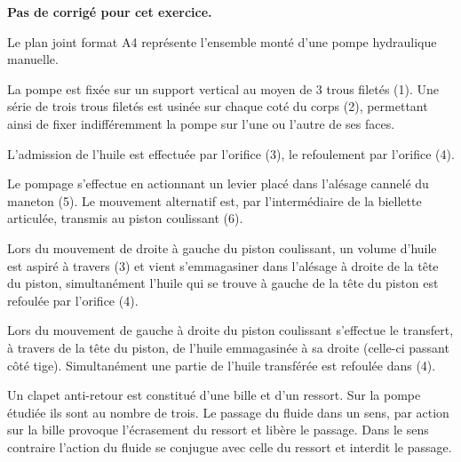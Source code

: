 \normalfalse \difficiletrue \tdifficilefalse
\correctionfalse

\setcounter{numques}{0}

\ifcorrection
\else
\textbf{Pas de corrigé pour cet exercice.}
\fi


Le plan joint format A4 représente l’ensemble monté d’une pompe hydraulique manuelle.

La pompe est fixée sur un support vertical au moyen de 3 trous filetés (1). Une série de trois trous filetés est usinée sur chaque coté du corps (2), permettant ainsi de fixer indifféremment la pompe sur l’une ou l’autre de ses faces.

L’admission de l’huile est effectuée par l’orifice (3), le refoulement par l’orifice (4).

Le pompage s’effectue en actionnant un levier placé dans l’alésage cannelé du maneton (5). Le mouvement alternatif est, par l’intermédiaire de la biellette articulée, transmis au piston coulissant (6).

Lors du mouvement de droite à gauche du piston coulissant, un volume d’huile est aspiré à travers (3) et vient s’emmagasiner dans l’alésage à droite de la tête du piston, simultanément l’huile qui se trouve à gauche de la tête du piston est refoulée par l’orifice (4).

Lors du mouvement de gauche à droite du piston coulissant s’effectue le transfert, à travers de la tête du piston, de l’huile emmagasinée à sa droite (celle-ci passant côté tige). Simultanément une partie de l’huile transférée est refoulée dans (4).

Un clapet anti-retour est constitué d’une bille et d’un ressort. Sur la pompe étudiée ils sont au nombre de trois. 
Le passage du fluide dans un sens, par action sur la bille provoque l’écrasement du ressort et libère le passage. 
Dans le sens contraire l’action du fluide se conjugue avec celle du ressort et interdit le passage. 


